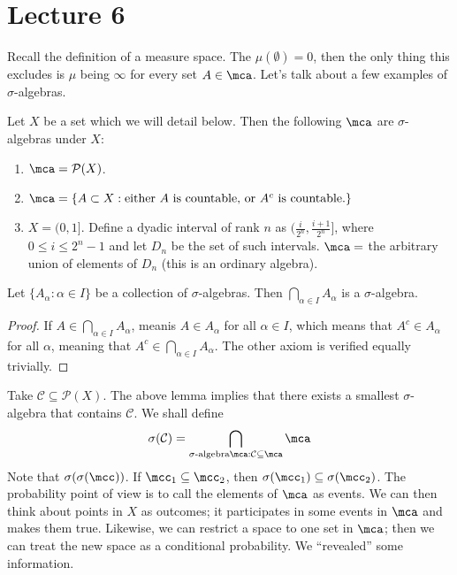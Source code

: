 
\section{Lecture 6}
Recall the definition of a measure space. The $\mu(\emptyset) = 0$, then the only thing
this excludes is $\mu$ being $\infty$ for every set $A \in \mca$. Let's talk about a few examples of $\sigma$-algebras.
\begin{example}
    Let $X$ be a set which we will detail below. Then the following $\mca$ are $\sigma$-algebras under $X$:
    \begin{enumerate}
        \item $\mca = \mathcal{P}(X)$.
        \item $\mca = \{ A \subset X: \text{either $A$ is countable, or $A^c$ is countable.} \}$
        \item $X = (0, 1]$. Define a dyadic interval of rank $n$ as $(\frac{i}{2^n}, \frac{i + 1}{2^n}]$, where $0 \le i \le 2^n - 1$
        and let $D_n$ be the set of such intervals. $\mca = $ the arbitrary union of elements of $D_n$ (this is an ordinary algebra).
    \end{enumerate}
\end{example}

\begin{lemma}
    Let $\{A_{\alpha}: \alpha \in I\}$ be a collection of $\sigma$-algebras. Then $\bigcap_{\alpha \in I} A_{\alpha}$ is a $\sigma$-algebra.
    \begin{proof}
        If $A \in \bigcap_{\alpha \in I} A_{\alpha}$, meanis $A \in A_{\alpha}$ for all $\alpha \in I$, which means that $A^c \in A_{\alpha}$ for all $\alpha$,
        meaning that $A^c \in \bigcap_{\alpha \in I} A_{\alpha}$. The other axiom is verified equally trivially.
    \end{proof}
\end{lemma}
Take $\mathcal{C} \subseteq \mathcal{P}(X)$. The above lemma implies that there exists a smallest $\sigma$-algebra that contains $\mathcal{C}$.
We shall define 
\[ \sigma(\mathcal{C}) = \bigcap_{\sigma\text{-algebra} \mca: \mathcal{C} \subseteq \mca} \mca \]
Note that $\sigma(\sigma(\mcc))$.
If $\mcc_1 \subseteq \mcc_2$, then $\sigma(\mcc_1) \subseteq \sigma(\mcc_2)$. The probability point of view
is to call the elements of $\mca$ as events. We can then think about points in $X$ as outcomes; it participates in some events in $\mca$
and makes them true. Likewise, we can restrict a space to one set in $\mca$; then we can treat the new space as a conditional probability.
We ``revealed'' some information.

